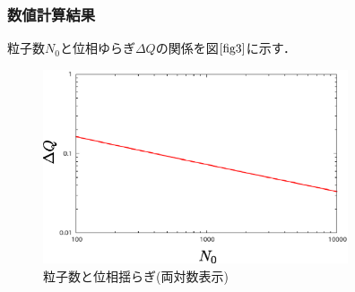 \documentclass[10.5pt,a4paper]{jreport}
\begin{document}
\subsubsection{数値計算結果}
粒子数$N_0$と位相ゆらぎ$\Delta Q$の関係を図$\ref{fig3}$に示す．

\begin{figure}[htbp]
  \centering
  \includegraphics[width = 9cm]{./EPS/fig3.eps}
  \caption{粒子数と位相揺らぎ(両対数表示)}
  \label{fig3}
\end{figure}
\end{document}
